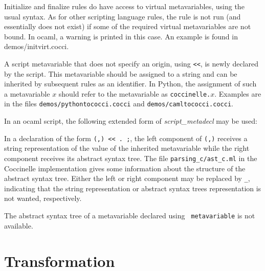 Initialize and finalize rules do have access to virtual metavariables,
using the usual syntax.  As for other scripting language rules, the rule
is not run (and essentially does not exist) if some of the required virtual
metavariables are not bound.  In ocaml, a warning is printed in this case.
An example is found in demos/initvirt.cocci.

A script metavariable that does not specify an origin, using \texttt{<<},
is newly declared by the script.  This metavariable should be assigned to a
string and can be inherited by subsequent rules as an identifier.  In
Python, the assignment of such a metavariable $x$ should refer to the
metavariable as {\tt coccinelle.\(x\)}.  Examples are in the files
\texttt{demos/pythontococci.cocci} and \texttt{demos/camltococci.cocci}.

In an ocaml script, the following extended form of \textit{script\_metadecl}
may be used:

\begin{grammar}
\end{grammar}

\noindent
In a declaration of the form \texttt{(,) <{}<
  . ;}, the left component of \texttt{(,)}
receives a string representation of the value of the inherited metavariable
while the right component receives its abstract syntax tree.  The file
\texttt{parsing\_c/ast\_c.ml} in the Coccinelle implementation gives some
information about the structure of the abstract syntax tree.  Either the
left or right component may be replaced by \verb+_+, indicating that the
string representation or abstract syntax trees representation is not
wanted, respectively.

The abstract syntax tree of a metavariable declared using {\tt
  metavariable} is not available.

\section{Transformation}

